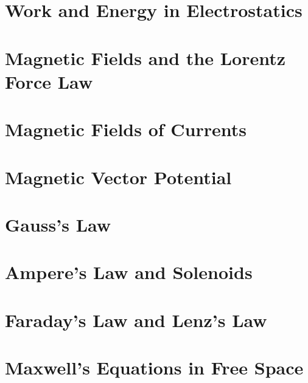 \documentclass[
  letterpaper,
  DIV=11,
  numbers=noendperiod]{scrreprt}
\begin{document}
\chapter{Work and Energy in
Electrostatics}\label{work-and-energy-in-electrostatics}


\chapter{Magnetic Fields and the Lorentz Force
Law}\label{magnetic-fields-and-the-lorentz-force-law}


\chapter{Magnetic Fields of Currents}\label{magnetic-fields-of-currents}


\chapter{Magnetic Vector Potential}\label{magnetic-vector-potential}


\chapter{Gauss's Law}\label{gausss-law}


\chapter{Ampere's Law and Solenoids}\label{amperes-law-and-solenoids}


\chapter{Faraday's Law and Lenz's Law}\label{faradays-law-and-lenzs-law}


\chapter{Maxwell's Equations in Free
Space}\label{maxwells-equations-in-free-space}
\end{document}
